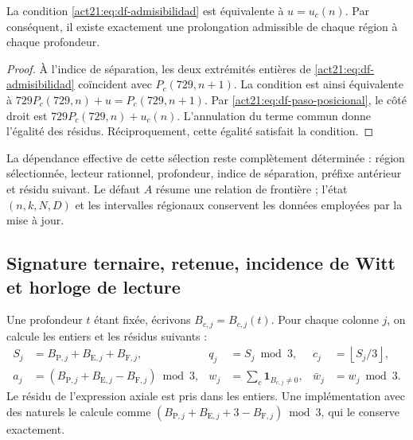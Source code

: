 \begin{theorem}
\label{act21:thm:df-prolongacion-unica}
La condition \eqref{act21:eq:df-admisibilidad} est équivalente à \(u=u_c(n)\).
Par conséquent, il existe exactement une prolongation admissible de chaque région
à chaque profondeur.
\end{theorem}

\begin{proof}
À l'indice de séparation, les deux extrémités entières de
\eqref{act21:eq:df-admisibilidad} coïncident avec \(P_c(729,n+1)\).
La condition est ainsi équivalente à
\(729P_c(729,n)+u=P_c(729,n+1)\).
Par \eqref{act21:eq:df-paso-posicional}, le côté droit est
\(729P_c(729,n)+u_c(n)\). L'annulation du terme commun donne l'égalité des résidus. Réciproquement, cette égalité satisfait la condition.
\end{proof}

La dépendance effective de cette sélection reste complètement déterminée :
région sélectionnée, lecteur rationnel, profondeur, indice de séparation,
préfixe antérieur et résidu suivant. Le défaut \(A\) résume une relation
de frontière ; l'état \((n,k,N,D)\) et les intervalles régionaux conservent
les données employées par la mise à jour.

\subsection{Signature ternaire, retenue, incidence de Witt et horloge de lecture}
\label{act21:subsec:df-firma-conjunta}


Une profondeur \(t\) étant fixée, écrivons \(B_{c,j}=B_{c,j}(t)\). Pour chaque colonne \(j\), on calcule les entiers et les résidus suivants :
\begin{align}
 S_j&=B_{\mathrm P,j}+B_{\mathrm E,j}+B_{\mathrm F,j},
 &q_j&=S_j\bmod3,
 &c_j&=\left\lfloor S_j/3\right\rfloor,
 \label{act21:eq:df-firma-qc}\\
 a_j&=(B_{\mathrm P,j}+B_{\mathrm E,j}-B_{\mathrm F,j})\bmod3,
 &w_j&=\sum_c\mathbf1_{B_{c,j}\ne0},
 &\bar w_j&=w_j\bmod3.
 \label{act21:eq:df-firma-axial}
\end{align}
Le résidu de l'expression axiale est pris dans les entiers. Une implémentation
avec des naturels le calcule comme
\((B_{\mathrm P,j}+B_{\mathrm E,j}+3-B_{\mathrm F,j})\bmod3\), qui le conserve
exactement.

